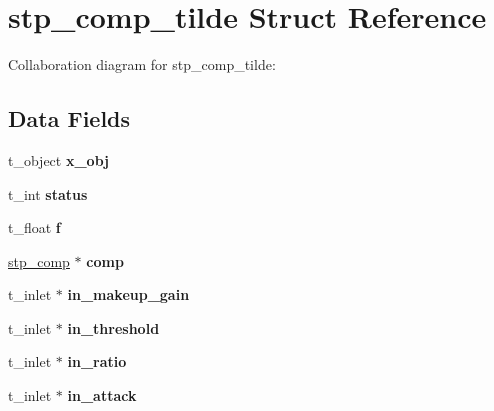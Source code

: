 \hypertarget{structstp__comp__tilde}{}\section{stp\+\_\+comp\+\_\+tilde Struct Reference}
\label{structstp__comp__tilde}


Collaboration diagram for stp\+\_\+comp\+\_\+tilde\+:
\subsection*{Data Fields}
\begin{DoxyCompactItemize}
\item 
\mbox{\label{structstp__comp__tilde_aec9b618f42517cd6740f1d37dba87d0a}} 
t\+\_\+object {\bfseries x\+\_\+obj}
\item 
\mbox{\label{structstp__comp__tilde_a75644de3b10c8d3a399b3a16c0c79bb5}} 
t\+\_\+int {\bfseries status}
\item 
\mbox{\label{structstp__comp__tilde_a73198eb29c82f0df575e45396b68c18c}} 
t\+\_\+float {\bfseries f}
\item 
\mbox{\label{structstp__comp__tilde_aa3338e16b7f4e51dcbeae10b6393d782}} 
\mbox{\hyperlink{structstp__comp}{stp\+\_\+comp}} $\ast$ {\bfseries comp}
\item 
\mbox{\label{structstp__comp__tilde_a2eb6b10353419693c5b41b55998e86d1}} 
t\+\_\+inlet $\ast$ {\bfseries in\+\_\+makeup\+\_\+gain}
\item 
\mbox{\label{structstp__comp__tilde_a841ce19aed9192c5efc40b15d4dac2cd}} 
t\+\_\+inlet $\ast$ {\bfseries in\+\_\+threshold}
\item 
\mbox{\label{structstp__comp__tilde_a17056bd96c6f245b2b6752b9c58b3b02}} 
t\+\_\+inlet $\ast$ {\bfseries in\+\_\+ratio}
\item 
\mbox{\label{structstp__comp__tilde_ab46f349fcd6cd83006d55f4302c272ad}} 
t\+\_\+inlet $\ast$ {\bfseries in\+\_\+attack}
\item 

\end{DoxyCompactItemize}
